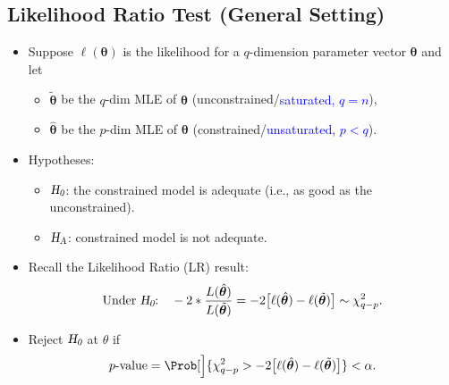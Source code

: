 \documentclass{article}\usepackage[]{graphicx}\usepackage[svgnames]{xcolor}
\let\log\relax%
\newcommand{\HN}{\textsl{H}_{\textsl{0}}}%
\newcommand{\HA}{\textsl{H}_{\textsl{A}}}%
\providecommand{\Vector}[1]{\bm{#1}}%
\begin{document}
\subsection*{Likelihood Ratio Test (General Setting)}
\begin{itemize}
      \item Suppose $ \ell(\Vector{\theta}) $ is the likelihood for a $ q $-dimension parameter vector $ \Vector{\theta} $ and let
            \begin{itemize}
                  \item $ \tilde{\Vector{\theta}} $ be the $ q $-dim MLE of $ \Vector{\theta} $ (unconstrained/\textcolor{Blue}{saturated, $ q=n $}),
                  \item $ \hat{\Vector{\theta}} $ be the $ p $-dim MLE of $ \Vector{\theta} $ (constrained/\textcolor{Blue}{unsaturated, $ p<q $}).
            \end{itemize}
      \item Hypotheses:
            \begin{itemize}
                  \item $ \HN $: the constrained model is adequate (i.e., as good as the unconstrained).
                  \item $ \HA $: constrained model is not adequate.
            \end{itemize}
      \item Recall the Likelihood Ratio (LR) result:
            \[ \text{Under $ \HN $:}\quad -2\log*{\frac{L(\hat{\Vector{\theta}})}{L(\tilde{\Vector{\theta}})}}
                  =-2\bigl[\ell(\hat{\Vector{\theta}})-\ell(\tilde{\Vector{\theta}})\bigr]\sim \chi^2_{q-p}. \]
      \item Reject $ \HN $ at $ \theta $ if
            \[ p\text{-value}=\Prob[\Big]{\chi^2_{q-p}>-2\bigl[\ell(\hat{\Vector{\theta}})-\ell(\tilde{\Vector{\theta}})\bigr]}<\alpha. \]
\end{itemize}
\end{document}
